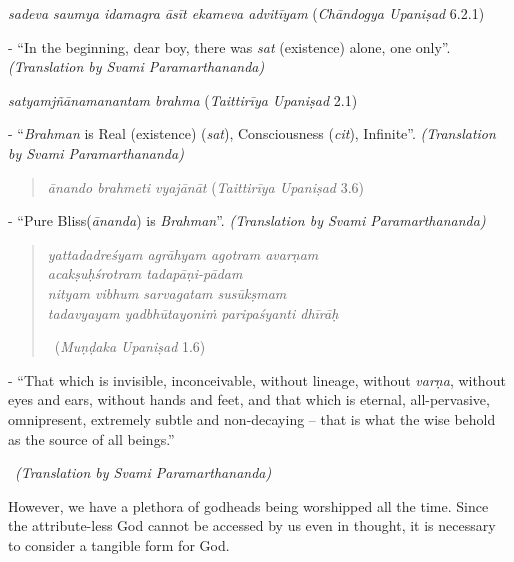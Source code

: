 \textit{sadeva saumya idamagra āsīt ekameva advitīyam } (\textit{Chāndogya Upaniṣad} 6.2.1)

\begin{myquote}
- ``In the beginning, dear boy, there was \textit{sat} (existence) alone, one only”. \textit{(Translation by Svami Paramarthananda)}
\end{myquote}

\textit{satyamjñānamanantam brahma } (\textit{Taittirīya Upaniṣad} 2.1)

\begin{myquote}
- ``\textit{Brahman} is Real (existence) (\textit{sat}), Consciousness (\textit{cit}), Infinite”. \textit{(Translation by Svami Paramarthananda)}
\end{myquote}

\begin{verse}
\textit{ānando brahmeti vyajānāt } (\textit{Taittirīya Upaniṣad} 3.6)
\end{verse}

\begin{myquote}
- ``Pure Bliss(\textit{ānanda}) is \textit{Brahman}”. \textit{(Translation by Svami Paramarthananda)}
\end{myquote}

\begin{verse}
\textit{yattadadreśyam agrāhyam agotram avarṇam}\\\textit{acakṣuḥśrotram tadapāṇi-pādam }\\\textit{nityam vibhum sarvagatam susūkṣmam}\\\textit{tadavyayam yadbhūtayoniṁ paripaśyanti dhīrāḥ } 

~\hfill (\textit{Muṇḍaka Upaniṣad} 1.6)
\end{verse}

\begin{myquote}
- ``That which is invisible, inconceivable, without lineage, without \textit{varṇa}, without eyes and ears, without hands and feet, and that which is eternal, all-pervasive, omnipresent, extremely subtle and non-decaying – that is what the wise behold as the source of all beings.” 

~\hfill \textit{(Translation by Svami Paramarthananda)}
\end{myquote}

However, we have a plethora of godheads being worshipped all the time. Since the attribute-less God cannot be accessed by us even in thought, it is necessary to consider a tangible form for God.

